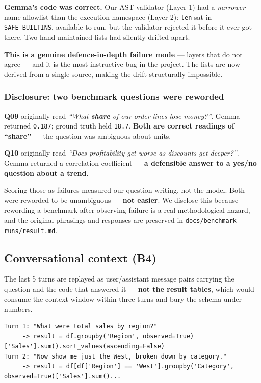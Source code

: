 \documentclass[11pt,a4paper]{article}
\begin{document}
\textbf{Gemma's code was correct.} Our AST validator (Layer 1) had a \emph{narrower}
name allowlist than the execution namespace (Layer 2): \texttt{len} sat in
\texttt{SAFE\_BUILTINS}, available to run, but the validator rejected it before it ever
got there. Two hand-maintained lists had silently drifted apart.

\textbf{This is a genuine defence-in-depth failure mode} --- layers that do not agree
--- and it is the most instructive bug in the project. The lists are now derived from a
single source, making the drift structurally impossible.

\subsubsection*{Disclosure: two benchmark questions were reworded}

\textbf{Q09} originally read \emph{``What \textbf{share} of our order lines lose
money?''}. Gemma returned \texttt{0.187}; ground truth held \texttt{18.7}. \textbf{Both
are correct readings of ``share''} --- the question was ambiguous about units.

\textbf{Q10} originally read \emph{``Does profitability get worse as discounts get
deeper?''}. Gemma returned a correlation coefficient --- \textbf{a defensible answer to
a yes/no question about a trend}.

Scoring those as failures measured our question-writing, not the model. Both were
reworded to be unambiguous --- \textbf{not easier}. We disclose this because rewording
a benchmark after observing failure is a real methodological hazard, and the original
phrasings and responses are preserved in \texttt{docs/benchmark-runs/result.md}.

\subsection{Conversational context (B4)}

The last 5 turns are replayed as user/assistant message pairs carrying the question and
the code that answered it --- \textbf{not the result tables}, which would consume the
context window within three turns and bury the schema under numbers.

\begin{lstlisting}
Turn 1: "What were total sales by region?"
     -> result = df.groupby('Region', observed=True)['Sales'].sum().sort_values(ascending=False)
Turn 2: "Now show me just the West, broken down by category."
     -> result = df[df['Region'] == 'West'].groupby('Category', observed=True)['Sales'].sum()...
\end{lstlisting}
\end{document}
